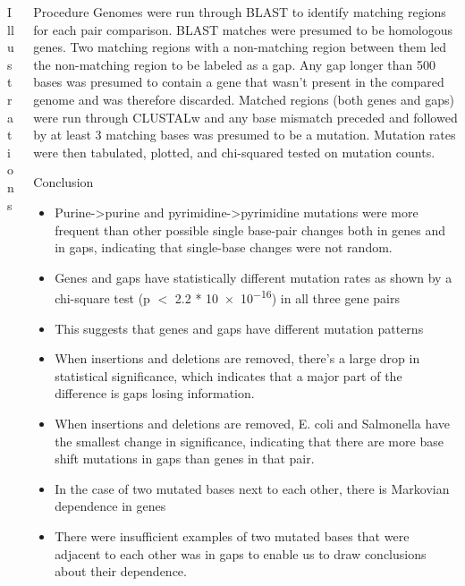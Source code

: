 \documentclass[final]{beamer}
\begin{document}
\begin{frame}{}
\begin{columns}[t]
\begin{column}{.32 \linewidth}
\begin{block}{\large Illustrations}
				
			\end{block}
			
			
		\end{column}
		
		
		
		
		\begin{column}{.32 \linewidth}
			
			\begin{block}{Procedure}
				Genomes were run through BLAST to identify matching regions for each pair comparison. BLAST matches were presumed to be homologous genes. Two matching regions with a non-matching region between them led the non-matching region to be labeled as a gap. Any gap longer than 500 bases was presumed to contain a gene that wasn't present in the compared genome and was therefore discarded.
				\newline
				Matched regions (both genes and gaps) were run through CLUSTALw and any base mismatch preceded and followed by at least 3 matching bases was presumed to be a mutation. Mutation rates were then tabulated, plotted, and chi-squared tested on mutation counts.
			\end{block}
			\begin{block}{\large Conclusion}
				\begin{itemize}
					\item Purine->purine and pyrimidine->pyrimidine mutations were more frequent than other possible single base-pair changes both in genes and in gaps, indicating that single-base changes were not random.
					\item 
					Genes and gaps have statistically different mutation rates as shown by a chi-square test (p $<$ \num{2.2} * \num{10e-16}) in all three gene pairs
					\item This suggests that genes and gaps have different mutation patterns
					\item When insertions and deletions are removed, there's a large drop in statistical significance, which indicates that a major part of the difference is gaps losing information.
					\item When insertions and deletions are removed, E. coli and Salmonella have the smallest change in significance, indicating that there are more base shift mutations in gaps than genes in that pair.
					\item In the case of two mutated bases next to each other, there is Markovian dependence in genes
					\item There were insufficient examples of two mutated bases that were adjacent to each other was in gaps to enable us to draw conclusions about their dependence.
					

\end{itemize}
\end{block}
\end{column}
\end{columns}
\end{frame}
\end{document}
